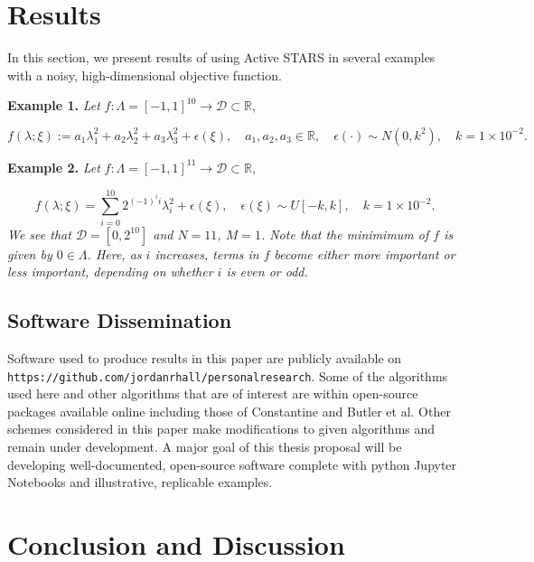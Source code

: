 \documentclass{amsart}
\newcommand{\D}{\mathcal{D}}
\newcommand{\R}{\mathbb{R}}
\begin{document}
\section{Results}

In this section, we present results of using Active STARS in several examples with a noisy, high-dimensional objective function.

\noindent \textbf{Example 1.} \textit{Let} $f: \Lambda=[-1,1]^{10} \to \D \subset \mathbb{R},$ 

$$f(\lambda; \xi):=a_1\lambda_{1}^2+a_2\lambda_{2}^2+a_3\lambda_{3}^2 + \epsilon(\xi), \quad a_1,a_2,a_3 \in \R, \quad \epsilon(\cdot) \sim N(0,k^2), \quad k=1 \times 10^{-2}.$$

\noindent \textbf{Example 2.} \textit{Let} $f: \Lambda=[-1,1]^{11} \to \D \subset \R,$  

$$f(\lambda; \xi)=\sum_{i=0}^{10} 2^{(-1)^i i}\lambda_i^2+\epsilon(\xi), \quad \epsilon(\xi) \sim U[-k,k], \quad k=1 \times 10^{-2}.$$ \textit{We see that $\mathcal{D}=[0,2^{10}]$ and $N=11$, $M=1$. Note that the minimimum of $f$ is given by $0 \in \Lambda$. Here, as $i$ increases, terms in $f$ become either more important or less important, depending on whether $i$ is even or odd.}












\subsection{Software Dissemination}

Software used to produce results in this paper are publicly available on \texttt{https://github.com/jordanrhall/personalresearch}. Some of the algorithms used here and other algorithms that are of interest are within open-source packages available online including those of Constantine and Butler et al. Other schemes considered in this paper make modifications to given algorithms and remain under development. A major goal of this thesis proposal will be developing well-documented, open-source software complete with python Jupyter Notebooks and illustrative, replicable examples.


\section{Conclusion and Discussion}
\end{document}
